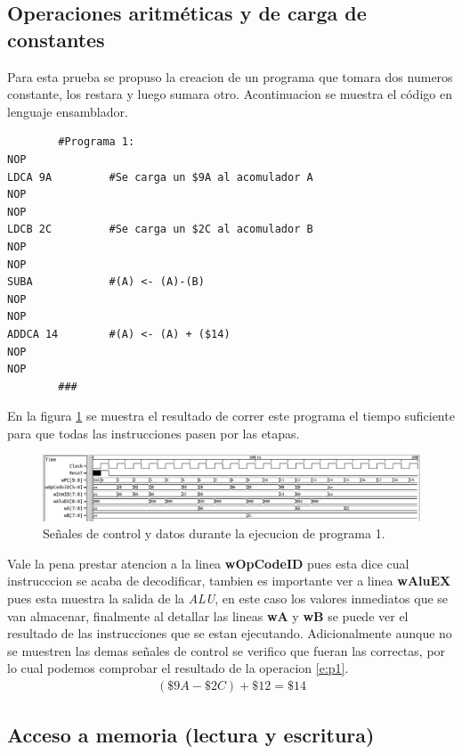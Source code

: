 \documentclass[paper=letter, fontsize=12pt]{article}
\begin{document}
\subsection{Operaciones aritméticas y de carga de constantes}
Para esta prueba se propuso la creacion de un programa que tomara dos numeros constante, los restara y luego sumara otro. Acontinuacion se muestra el código en lenguaje ensamblador.

\begin{lstlisting}
		#Programa 1:
NOP
LDCA 9A			#Se carga un $9A al acomulador A
NOP
NOP
LDCB 2C			#Se carga un $2C al acomulador B
NOP
NOP
SUBA			#(A) <- (A)-(B)
NOP
NOP
ADDCA 14		#(A) <- (A) + ($14)
NOP
NOP
		###
\end{lstlisting}

En la figura \ref{i:p1} se muestra el resultado de correr este programa el tiempo suficiente para que todas las instrucciones pasen por las etapas.\\

\begin{figure}[hbtp]
\centering
\includegraphics[width=1\linewidth]{../media/Prog1.png}
\caption{Señales de control y datos durante la ejecucion de programa 1.}
\label{i:p1}
\end{figure}

Vale la pena prestar atencion a la linea \textbf{wOpCodeID} pues esta dice cual instrucccion se acaba de decodificar, tambien es importante ver a linea \textbf{wAluEX} pues esta muestra la salida de la \textit{ALU}, en este caso los valores inmediatos que se van almacenar, finalmente al detallar las lineas \textbf{wA} y \textbf{wB} se puede ver el resultado de las instrucciones que se estan ejecutando. Adicionalmente aunque no se muestren las demas señales de control se verifico que fueran las correctas, por lo cual podemos comprobar el resultado de la operacion \ref{e:p1}.\\

\begin{align} 
\label{e:p1}
(\$9A - \$2C) + \$12 = \$14
\end{align}

\subsection{Acceso a memoria (lectura y escritura)}
\end{document}

